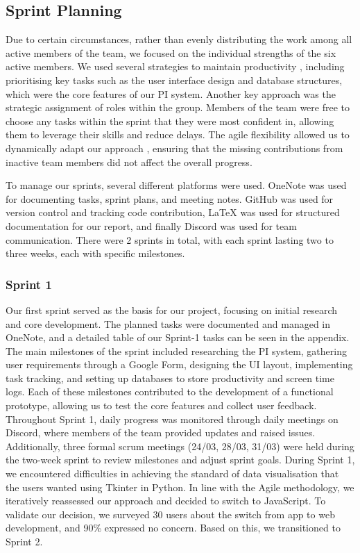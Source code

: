 \documentclass[12pt,a4paper]{article}
\begin{document}
\subsection{Sprint Planning}
Due to certain circumstances, rather than evenly distributing the work among all active members of the team, we focused on the individual strengths of the six active members. We used several strategies to maintain productivity , including prioritising key tasks such as the user interface design and database structures, which were the core features of our PI system. Another key approach was the strategic assignment of roles within the group. Members of the team were free to choose any tasks within the sprint that they were most confident in, allowing them to leverage their skills and reduce delays. The agile flexibility allowed us to dynamically adapt our approach , ensuring that the missing contributions from inactive team members did not affect the overall progress.

To manage our sprints, several different platforms were used. OneNote was used for documenting tasks, sprint plans, and meeting notes. GitHub was used for version control and tracking code contribution, LaTeX was used for structured documentation for our report, and finally Discord was used for team communication. There were 2 sprints in total, with each sprint lasting two to three weeks, each with specific milestones.

\subsubsection{Sprint 1}
Our first sprint served as the basis for our project, focusing on initial research and core development. The planned tasks were documented and managed in OneNote, and a detailed table of our Sprint-1 tasks can be seen in the appendix. The main milestones of the sprint included researching the PI system, gathering user requirements through a Google Form, designing the UI layout, implementing task tracking, and setting up databases to store productivity and screen time logs. Each of these milestones contributed to the development of a functional prototype, allowing us to test the core features and collect user feedback. Throughout Sprint 1, daily progress was monitored through daily meetings on Discord, where members of the team provided updates and raised issues. Additionally, three formal scrum meetings (24/03, 28/03, 31/03) were held during the two-week sprint to review milestones and adjust sprint goals. During Sprint 1, we encountered difficulties in achieving the standard of data visualisation that the users wanted using Tkinter in Python. In line with the Agile methodology, we iteratively reassessed our approach and decided to switch to JavaScript. To validate our decision, we surveyed 30 users about the switch from app to web development, and 90\% expressed no concern. Based on this, we transitioned to Sprint 2.
\end{document}
